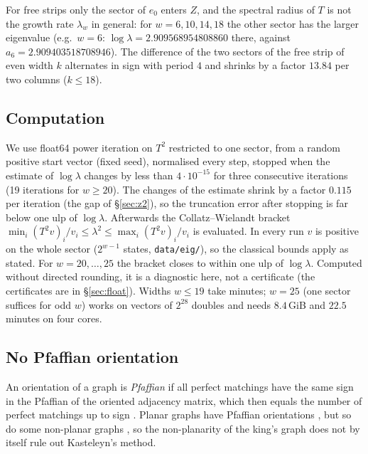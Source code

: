 \documentclass[11pt]{amsart}
\theoremstyle{definition}
\theoremstyle{remark}
\newcommand{\file}[1]{\texttt{#1}}
\begin{document}
For free strips only the sector of $e_0$ enters $Z$, and the spectral radius of $T$ is not the
growth rate $\lambda_w$ in general: for $w = 6, 10, 14, 18$ the other sector has the larger
eigenvalue (e.g.\ $w = 6$: $\log\lambda = 2.909568954808860$ there, against
$a_6 = 2.909403518708946$). The difference of the two sectors of the free strip of even width
$k$ alternates in sign with period $4$ and shrinks by a factor $13.84$ per two columns
($k \le 18$).

\subsection{Computation}
We use float64 power iteration on $T^2$ restricted to one sector, from a random positive start
vector (fixed seed), normalised every step, stopped when the estimate of $\log \lambda$ changes
by less than $4\cdot10^{-15}$ for three consecutive iterations (19 iterations for $w \ge 20$).
The changes of the estimate shrink by a factor $0.115$ per iteration (the gap of
\S\ref{sec:z2}), so the truncation error after stopping is far below one ulp of $\log\lambda$.
Afterwards the Collatz--Wielandt bracket $\min_i (T^2 v)_i / v_i \le \lambda^2 \le \max_i (T^2
v)_i / v_i$ \cite{collatz1942,wielandt1950} is evaluated. In every run $v$ is positive on the
whole sector ($2^{w-1}$ states, \file{data/eig/}), so the classical bounds apply as stated. For
$w = 20, \dots, 25$ the bracket closes to within one ulp of $\log \lambda$. Computed without
directed rounding, it is a diagnostic here, not a certificate (the certificates are in
\S\ref{sec:float}). Widths $w \le 19$ take minutes; $w = 25$ (one sector suffices for odd $w$)
works on vectors of $2^{28}$ doubles and needs $8.4$\,GiB and $22.5$ minutes on four cores.

\subsection{No Pfaffian orientation}
An orientation of a graph is \emph{Pfaffian} if all perfect matchings have the same sign in the
Pfaffian of the oriented adjacency matrix, which then equals the number of perfect matchings up to
sign \cite[Ch.~8]{lovaszplummer1986}. Planar graphs have Pfaffian orientations
\cite[Thm.~8.3.4]{lovaszplummer1986}, but so do some non-planar graphs
\cite[p.~323]{lovaszplummer1986}, so the non-planarity of the king's graph does not by itself rule
out Kasteleyn's method.
\end{document}
